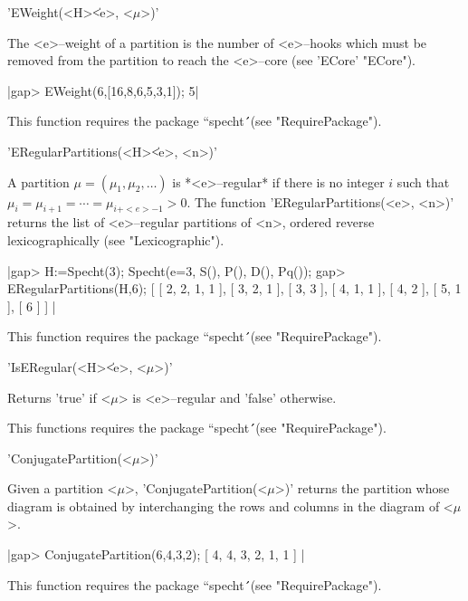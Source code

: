 
'EWeight(<H>\|<e>, <$\mu$>)'

The <e>--weight of a partition is the number of <e>--hooks which must be
removed from the partition to reach the <e>--core (see 'ECore' "ECore").

|gap> EWeight(6,[16,8,6,5,3,1]);
5|

This function requires the package ``specht\'\'\ (see "RequirePackage").



'ERegularPartitions(<H>\|<e>, <n>)'

A  partition $\mu=(\mu_1,\mu_2,\ldots)$ is *<e>--regular* if there is no
integer $i$ such that $\mu_i=\mu_{i+1}=\cdots=\mu_{i+<e>-1}>0$. The 
function 'ERegularPartitions(<e>, <n>)' returns the list of 
<e>--regular partitions of <n>, ordered reverse lexicographically (see 
"Lexicographic").

|gap> H:=Specht(3);
Specht(e=3, S(), P(), D(), Pq());
gap> ERegularPartitions(H,6);       
[ [ 2, 2, 1, 1 ], [ 3, 2, 1 ], [ 3, 3 ], [ 4, 1, 1 ], [ 4, 2 ], 
  [ 5, 1 ], [ 6 ] ] |

This function requires the package ``specht\'\'\ (see "RequirePackage").



'IsERegular(<H>\|<e>, <$\mu$>)'

Returns 'true' if <$\mu$> is <e>--regular and 'false' otherwise.

This functions requires the package ``specht\'\'\ (see "RequirePackage").



'ConjugatePartition(<$\mu$>)'

Given a partition <$\mu$>, 'ConjugatePartition(<$\mu$>)' returns the 
partition whose diagram is obtained by interchanging the rows and columns 
in the diagram of <$\mu$>.

|gap> ConjugatePartition(6,4,3,2);
[ 4, 4, 3, 2, 1, 1 ]
|

This function requires the package ``specht\'\'\ (see "RequirePackage").


